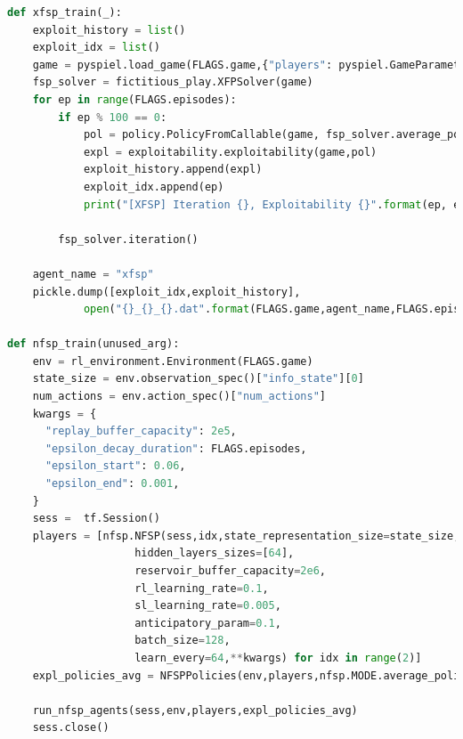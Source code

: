 \documentclass[10pt,a4paper]{article}
\begin{document}
\begin{lstlisting}[language=Python]
def xfsp_train(_):
    exploit_history = list()
    exploit_idx = list()
    game = pyspiel.load_game(FLAGS.game,{"players": pyspiel.GameParameter(2)})
    fsp_solver = fictitious_play.XFPSolver(game)
    for ep in range(FLAGS.episodes):
        if ep % 100 == 0:
            pol = policy.PolicyFromCallable(game, fsp_solver.average_policy_callable())
            expl = exploitability.exploitability(game,pol)
            exploit_history.append(expl)
            exploit_idx.append(ep)
            print("[XFSP] Iteration {}, Exploitability {}".format(ep, expl))

        fsp_solver.iteration()

    agent_name = "xfsp"
    pickle.dump([exploit_idx,exploit_history],
            open("{}_{}_{}.dat".format(FLAGS.game,agent_name,FLAGS.episodes),"wb"))

def nfsp_train(unused_arg):
    env = rl_environment.Environment(FLAGS.game)
    state_size = env.observation_spec()["info_state"][0]
    num_actions = env.action_spec()["num_actions"]
    kwargs = {
      "replay_buffer_capacity": 2e5,
      "epsilon_decay_duration": FLAGS.episodes,
      "epsilon_start": 0.06,
      "epsilon_end": 0.001,
    }
    sess =  tf.Session()
    players = [nfsp.NFSP(sess,idx,state_representation_size=state_size,num_actions=num_actions,
                    hidden_layers_sizes=[64],
                    reservoir_buffer_capacity=2e6,
                    rl_learning_rate=0.1,
                    sl_learning_rate=0.005,
                    anticipatory_param=0.1,
                    batch_size=128,
                    learn_every=64,**kwargs) for idx in range(2)]  
    expl_policies_avg = NFSPPolicies(env,players,nfsp.MODE.average_policy)
    
    run_nfsp_agents(sess,env,players,expl_policies_avg)
    sess.close()
\end{lstlisting}
\newpage
\end{document}
